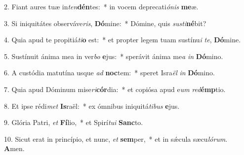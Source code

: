 2. Fiant aures tuæ in\textit{ten}\textbf{dén}tes:~*  in vocem deprecati\textit{ó}\textit{nis} \textbf{me}æ.\

3. Si iniquitátes observáve\textit{ris}, \textbf{Dó}mine:~*  Dómine, quis \textit{sus}\textit{ti}\textbf{né}bit?\

4. Quia apud te propitiá\textit{ti}\textbf{o} est:~*  et propter legem tuam sustínu\textit{i} \textit{te}, \textbf{Dó}mine.\

5. Sustínuit ánima mea in ver\textit{bo} \textbf{e}jus:~*  sperávit ánima me\textit{a} \textit{in} \textbf{Dó}mino.\

6. A custódia matutína usque \textit{ad} \textbf{noc}tem:~*  speret Isra\textit{ël} \textit{in} \textbf{Dó}mino.\

7. Quia apud Dóminum mise\textit{ri}\textbf{cór}dia:~*  et copiósa apud e\textit{um} \textit{red}\textbf{émp}tio.\

8. Et ipse rédi\textit{met} \textbf{Is}raël:~*  ex ómnibus iniquitá\textit{ti}\textit{bus} \textbf{e}jus.\

9. Glória Patri, \textit{et} \textbf{Fí}lio,~*  et Spirí\textit{tu}\textit{i} \textbf{Sanc}to.\

10. Sicut erat in princípio, et nunc, \textit{et} \textbf{sem}per,~*  et in sǽcula sæcu\textit{ló}\textit{rum}. \textbf{A}men.\

